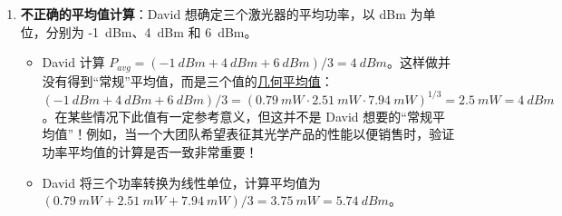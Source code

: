 \begin{enumerate}
    \item \textbf{不正确的平均值计算}：David 想确定三个激光器的平均功率，以 dBm 为单位，分别为 -1~dBm、4~dBm 和 6~dBm。
    \begin{itemize}
    \item[\redcross] David 计算 $P_{avg}=(-1~dBm+4~dBm+6~dBm)/3=4~dBm$。这样做并没有得到“常规”平均值，而是三个值的\href{https://en.wikipedia.org/wiki/Geometric_mean}{几何平均值}：$(-1~dBm+4~dBm+6~dBm)/3 = (0.79~mW \cdot 2.51~mW \cdot 7.94~mW)^{1/3}=2.5~mW = 4~dBm$。在某些情况下此值有一定参考意义，但这并不是 David 想要的“常规平均值”！例如，当一个大团队希望表征其光学产品的性能以便销售时，验证功率平均值的计算是否一致非常重要！
    \item[\greencheck] David 将三个功率转换为线性单位，计算平均值为 $(0.79~mW+2.51~mW+7.94~mW)/3=3.75~mW=5.74~dBm$。
    \end{itemize}
    
\end{enumerate}



